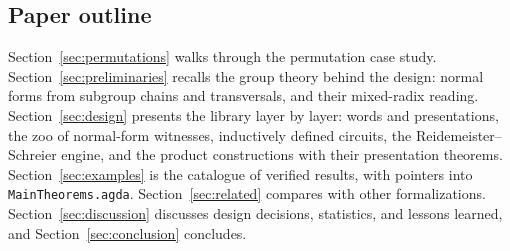 \subsection{Paper outline}

Section~\ref{sec:permutations} walks through the permutation case study.
Section~\ref{sec:preliminaries} recalls the group theory behind the design:
normal forms from subgroup chains and transversals, and their mixed-radix
reading.  Section~\ref{sec:design} presents the library layer by layer:
words and presentations, the zoo of normal-form witnesses, inductively
defined circuits, the Reidemeister--Schreier engine, and the product
constructions with their presentation theorems.  Section~\ref{sec:examples}
is the catalogue of verified results, with pointers into
\texttt{MainTheorems.agda}.  Section~\ref{sec:related} compares with other
formalizations.  Section~\ref{sec:discussion} discusses design decisions,
statistics, and lessons learned, and Section~\ref{sec:conclusion} concludes.
